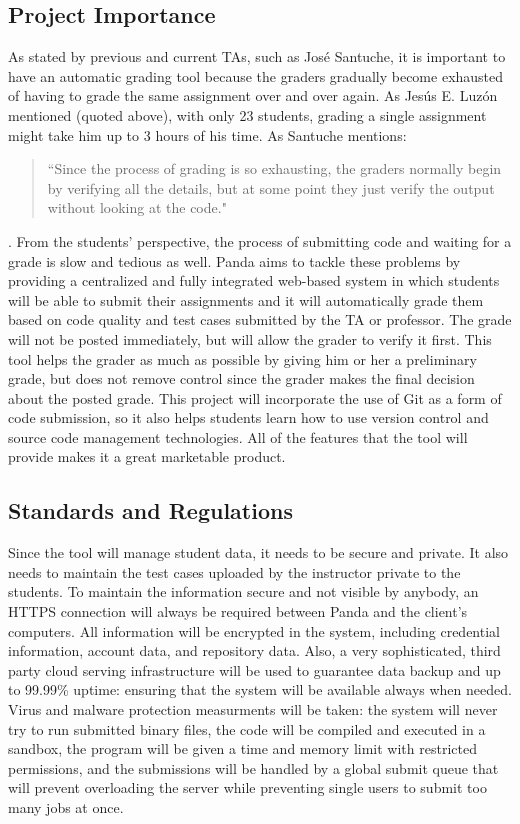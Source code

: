 \subsection{Project Importance}

As stated by previous and current TAs, such as José Santuche, it is important to
have an automatic grading tool because the graders gradually become exhausted of
having to grade the same assignment over and over again. As Jesús E. Luzón
mentioned (quoted above), with only 23 students, grading a single assignment
might take him up to 3 hours of his time. As Santuche mentions: \begin{quote}
``Since the process of grading is so exhausting, the graders normally begin by
verifying all the details, but at some point they just verify the output without
looking at the code." \end{quote}. From the students' perspective, the process
of submitting code and waiting for a grade is slow and tedious as well. Panda
aims to tackle these problems by providing a centralized and fully integrated
web-based system in which students will be able to submit their assignments and
it will automatically grade them based on code quality and test cases submitted
by the TA or professor. The grade will not be posted immediately, but will allow
the grader to verify it first. This tool helps the grader as much as possible by
giving him or her a preliminary grade, but does not remove control since the
grader makes the final decision about the posted grade. This project will
incorporate the use of Git as a form of code submission, so it also helps
students learn how to use version control and source code management
technologies. All of the features that the tool will provide makes it a great
marketable product.

\subsection{Standards and Regulations} Since the tool will manage student data,
it needs to be secure and private. It also needs to maintain the test cases
uploaded by the instructor private to the students. To maintain the information
secure and not visible by anybody, an HTTPS connection will always be required
between Panda and the client's computers. All information will be encrypted in
the system, including credential information, account data, and repository data.
Also, a very sophisticated, third party cloud serving infrastructure will be
used to guarantee data backup and up to 99.99\% uptime: ensuring that the system
will be available always when needed. Virus and malware protection measurments
will be taken: the system will never try to run submitted binary files, the code
will be compiled and executed in a sandbox, the program will be given a time and
memory limit with restricted permissions, and the submissions will be handled by
a global submit queue that will prevent overloading the server while preventing
single users to submit too many jobs at once.
